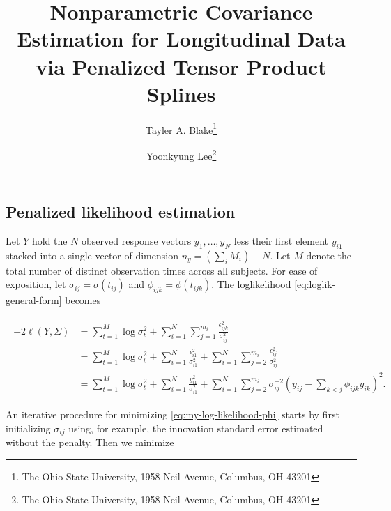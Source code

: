 \documentclass[12pt]{article}
\theoremstyle{definition}
\def\bL{\mathbf{L}}
\begin{document}
\def\bL{\mathbf{L}}



\title{ Nonparametric Covariance Estimation for Longitudinal Data via Penalized Tensor Product Splines}

\author{Tayler A. Blake\thanks{The Ohio State University, 1958 Neil Avenue, Columbus, OH 43201} \and  Yoonkyung Lee\thanks{The Ohio State University, 1958 Neil Avenue, Columbus, OH 43201}}


\maketitle

\subsection{Penalized likelihood estimation}
Let $Y$ hold the $N$ observed response vectors $y_1,\dots, y_N$ less their first element $y_{i1}$ stacked into a single vector of dimension $n_y=\left(\sum \limits_{i} M_i \right) - N$. Let $M$ denote the total number of distinct observation times across all subjects. For ease of exposition, let $\sigma_{ij} = \sigma\left( t_{ij} \right)$ and $\phi_{ijk} = \phi \left(t_{ijk} \right)$. The loglikelihood \ref{eq:loglik-general-form} becomes

\begin{align}
\begin{split} \label{eq:my-log-lik-phi}
-2\ell\left(Y, \Sigma \right) &=  \sum_{t = 1}^M \log \sigma_t^2  + \sum_{i = 1}^N \sum_{j = 1}^{m_i} \frac {\epsilon_{ijk}^2}{\sigma_{ij}^2}\\
&= \sum_{t = 1}^M \log \sigma_t^2  + \sum_{i = 1}^N \frac{\epsilon_{i1}^2}{\sigma_{i1}^2} + \sum_{i = 1}^N \sum_{j = 2}^{m_i} \frac{\epsilon_{ij}^2}{\sigma_{ij}^{2}} \\
&= \sum_{t = 1}^M \log \sigma_t^2  + \sum_{i = 1}^N \frac{y_{i1}^2}{\sigma_{i1}^2} + \sum_{i = 1}^N \sum_{j = 2}^{m_i} \sigma_{ij}^{-2} \left( y_{ij} - \sum \limits_{k < j}\phi_{ijk} y_{ik}  \right)^2.
\end{split}
\end{align}
\noindent

An iterative procedure for minimizing \ref{eq:my-log-likelihood-phi} starts by first initializing $\sigma_{ij}$ using, for example, the innovation standard error estimated without the penalty. Then we minimize 
\end{document}
